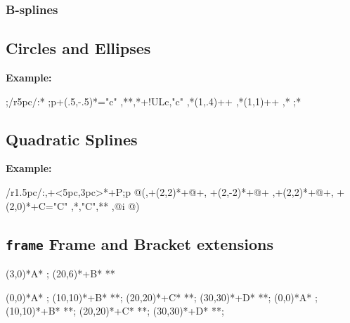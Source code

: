 \documentclass{article}
\newenvironment{code}{\par\noindent\textbf{Example:}\par\noindent}{}
\begin{document}
\subsubsection{B-splines}
\subsection{Circles and Ellipses}
\begin{code}
;/r5pc/:*\dir{*}
 ;p+(.5,-.5)*\dir{*}="c"
,**\dir{-},*+!UL{c},"c"
,*\xycircle(1,.4){++\dir{<}}
,*\xycircle(1,1){++\dir{>}}
,*\xycircle<15pt,10pt>{}
;*
\endxy
\end{code}
\subsection{Quadratic Splines}
\begin{code}
\xy /r1.5pc/:,+<5pc,3pc>*+{P};p 
@(,+(2,2)*{+}@+, +(2,-2)*{+}@+ 
,+(2,2)*{+}@+, +(2,0)*+{C}="C"
,*\qspline{},"C",**
,@i @)\endxy
\end{code}

\subsection{\texttt{frame} Frame and Bracket extensions}
\xy (3,0)*{A}*\frm{-} ; (20,6)*+{B}* **\dir{-} \endxy

\xy (0,0)*{A}*\frm{-} ;
 (10,10)*+{B}*\frm{-} **\dir{-};
 (20,20)*+{C}*\frm{-} **\dir{-};
 (30,30)*+{D}*\frm{-} **\dir{-};
\endxy
\xy (0,0)*{A}* ;
 (10,10)*+{B}* **\dir{-};
 (20,20)*+{C}* **\dir{-};
 (30,30)*+{D}* **\dir{-};
\endxy
\end{document}
